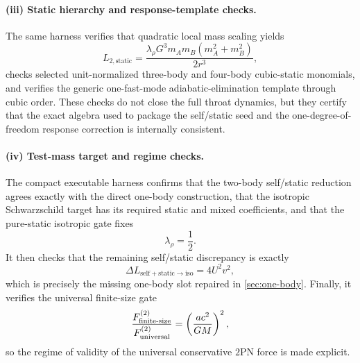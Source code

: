 \documentclass[11pt]{article}
\newcommand{\TwoPN}{\mathrm{2PN}}
\begin{document}
\paragraph{(iii) Static hierarchy and response-template checks.}
The same harness verifies that quadratic local mass scaling yields
\begin{equation}
L_{2,\mathrm{static}}
=\frac{\lambda_\rho G^3m_A m_B(m_A^2+m_B^2)}{2r^3},
\label{eq:verification-static-general}
\end{equation}
checks selected unit-normalized three-body and four-body cubic-static monomials, and
verifies the generic one-fast-mode adiabatic-elimination template through cubic order.
These checks do not close the full throat dynamics, but they certify that the exact algebra
used to package the self/static seed and the one-degree-of-freedom response correction is
internally consistent.

\paragraph{(iv) Test-mass target and regime checks.}
The compact executable harness confirms that the two-body self/static reduction agrees
exactly with the direct one-body construction, that the isotropic Schwarzschild target has
its required static and mixed coefficients, and that the pure-static isotropic gate fixes
\begin{equation}
\lambda_\rho=\frac12.
\label{eq:verification-lambda-rho}
\end{equation}
It then checks that the remaining self/static discrepancy is exactly
\begin{equation}
\Delta L_{\mathrm{self+static}\rightarrow\mathrm{iso}}
=4U^2v^2,
\label{eq:verification-residual-4u2v2}
\end{equation}
which is precisely the missing one-body slot repaired in \cref{sec:one-body}.
Finally, it verifies the universal finite-size gate
\begin{equation}
\frac{F_{\rm finite\text{-}size}^{(2)}}{F_{\rm universal}^{(2)}}
=\left(\frac{a c^2}{GM}\right)^2,
\label{eq:verification-finite-size-gate}
\end{equation}
so the regime of validity of the universal conservative \(\TwoPN\) force is made explicit.
\end{document}
